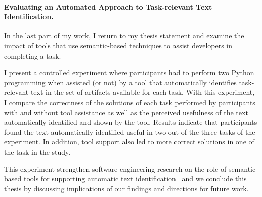\paragraph{\textbf{Evaluating an Automated Approach to Task-relevant Text Identification.}} 




In the last part of my work, I return to my thesis statement
and examine the impact of tools that use semantic-based techniques to assist developers in 
completing a task. 



I present a controlled experiment where participants had to 
perform two Python programming when assisted (or not) by a tool that automatically identifies task-relevant text 
in the set of artifacts available for each task. 
With this experiment, I compare the correctness of the solutions of each task 
performed by participants with and without tool assistance
as well as the perceived usefulness of the text automatically identified and shown by the tool. 
Results indicate that participants found the text automatically identified
useful in two out of the three tasks of the experiment.
In addition, tool support also led to more correct solutions 
in one of the task in the study.





This experiment strengthen software engineering research on the 
role of semantic-based tools for supporting
automatic text identification~\cite{nadi2020, Xu2017,Lotufo2012}
and we conclude this thesis by discussing implications of our findings and 
directions for future work.




